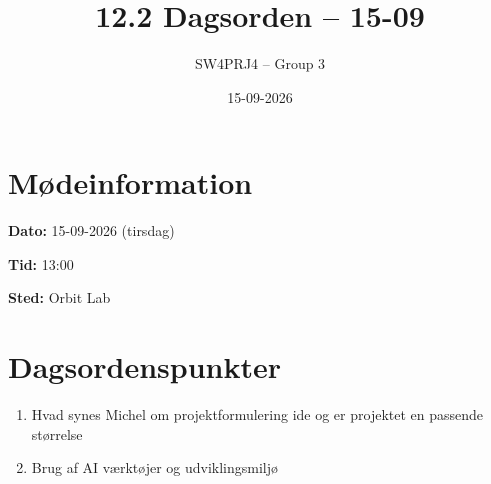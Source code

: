\documentclass[a4paper,11pt]{article}
\title{12.2 Dagsorden -- 15-09}
\author{SW4PRJ4 -- Group 3}
\date{15-09-2026}
\begin{document}
\maketitle

\section*{Mødeinformation}

\textbf{Dato:} 15-09-2026 (tirsdag)

\textbf{Tid:} 13:00

\textbf{Sted:} Orbit Lab

\section*{Dagsordenspunkter}

\begin{enumerate}
    \item Hvad synes Michel om projektformulering ide og er projektet en passende størrelse
    \item Brug af AI værktøjer og udviklingsmiljø
\end{enumerate}
\end{document}
